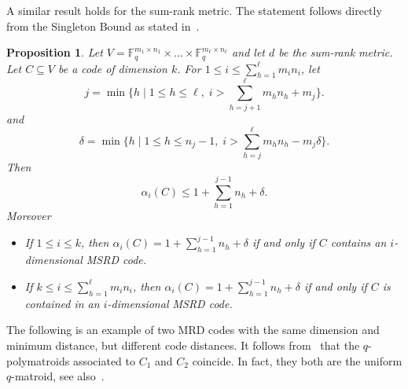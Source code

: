 \documentclass[12pt]{amsart}
\numberwithin{equation}{section}
\newtheorem{proposition}[theorem]{Proposition}
\theoremstyle{definition}
\begin{document}
A similar result holds for the sum-rank metric. The statement follows directly from the Singleton Bound as stated in~\cite[Corollary VI.5]{CGLLMS22}.

\begin{proposition}\label{alphaMSDR}
Let $V=\mathbb{F}_q^{m_1\times n_1}\times\ldots\times\mathbb{F}_q^{m_\ell\times n_\ell}$ and let $d$ be the sum-rank metric. Let $C \subseteq V$ be a code of dimension $k$. For $1\leq i\leq\sum_{h=1}^\ell m_i n_i$, let 
$$j=\min\{h\mid 1\leq h\leq\ell,\; i>\sum_{h=j+1}^{\ell} m_h n_h+m_j\}.$$
and $$\delta=\min\{h\mid 1\leq h\leq n_j-1,\; i>\sum_{h=j}^{\ell} m_h n_h-m_j\delta\}.$$
Then $$\alpha_i(C)\leq 1+\sum_{h=1}^{j-1} n_h+\delta.$$ 
Moreover
\begin{itemize}
\item If $1\leq i\leq k$, then $\alpha_i(C)=1+\sum_{h=1}^{j-1} n_h+\delta$ if and only if $C$ contains an $i$-dimensional MSRD code.
\item If $k \leq i\leq\sum_{h=1}^\ell m_i n_i$, then $\alpha_i(C)=1+\sum_{h=1}^{j-1} n_h+\delta$ if and only if $C$ is contained in an $i$-dimensional MSRD code.
\end{itemize}
\end{proposition}

The following is an example of two MRD codes with the same dimension and minimum distance, but different code distances. It follows from~\cite[Corollary~6.6]{GJLR20} that the $q$-polymatroids associated to $C_1$ and $C_2$ coincide. In fact, they both are the uniform $q$-matroid, see also~\cite[Example ~4.16]{JP16}.
\end{document}
